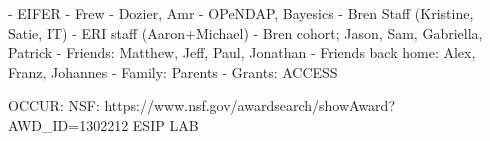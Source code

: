 \begin{acknowledgements}
- EIFER
- Frew
- Dozier, Amr
- OPeNDAP, Bayesics
- Bren Staff (Kristine, Satie, IT)
- ERI staff (Aaron+Michael)
- Bren cohort; Jason, Sam, Gabriella, Patrick
- Friends: Matthew, Jeff, Paul, Jonathan
- Friends back home: Alex, Franz, Johannes
- Family: Parents
- Grants: ACCESS

OCCUR:
NSF: https://www.nsf.gov/awardsearch/showAward?AWD_ID=1302212
ESIP LAB

\end{acknowledgements} 
